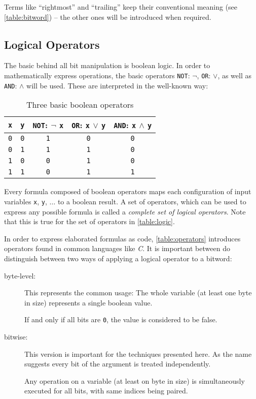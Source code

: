 Terms like ``rightmost'' and ``trailing''
keep their conventional meaning (see \autoref{table:bitword})
-- the other ones will be introduced when required.


\subsection*{Logical Operators}
The basic behind all bit manipulation is boolean logic.
In order to mathematically express operations, the basic operators
\lstinline$NOT$: $\lnot$, \lstinline$OR$: $\lor$,
as well as \lstinline$AND$: $\land$ will be used.
These are interpreted in the well-known way:

\begin{table}[h]
\centering
\begin{tabular}{c|c||c|c|c}
  \lstinline$x$ & \lstinline$y$
& \lstinline$NOT$: $\lnot$ \lstinline$x$
& \lstinline$OR$: \lstinline$x$ $\lor$ \lstinline$y$
& \lstinline$AND$: \lstinline$x$ $\land$ \lstinline$y$\\
\hline\hline
  \lstinline$0$ & \lstinline$0$
& \lstinline$1$ & \lstinline$0$ & \lstinline$0$\\
\hline
  \lstinline$0$ & \lstinline$1$
& \lstinline$1$ & \lstinline$1$ & \lstinline$0$\\
\hline
  \lstinline$1$ & \lstinline$0$
& \lstinline$0$ & \lstinline$1$ & \lstinline$0$\\
\hline
  \lstinline$1$ & \lstinline$1$
& \lstinline$0$ & \lstinline$1$ & \lstinline$1$\\
\end{tabular}
\caption{Three basic boolean operators}
\label{table:logic}
\end{table}

Every formula composed of boolean operators maps
each configuration of input variables
\lstinline$x$, \lstinline$y$, $\dots$ to a boolean result.
A set of operators, which can be used to express any possible formula
is called a \emph{complete set of logical operators}.
Note that this is true for the set of operators in \autoref{table:logic}.

In order to express elaborated formulas as code,
\autoref{table:operators} introduces operators
found in common languages like \emph{C}.
It is important between do distinguish between
two ways of applying a logical operator to a bitword:

\begin{description}
\item[byte-level:] This represents the common usage:
The whole variable (at least one byte in size)
represents a single boolean value.

If and only if all bits are \lstinline$0$,
the value is considered to be false.

\item[bitwise:] This version is important for the techniques presented here.
As the name suggests every bit of the argument is treated independently.

Any operation on a variable (at least on byte in size)
is simultaneously executed for all bits,
with same indices being paired.
\end{description}

